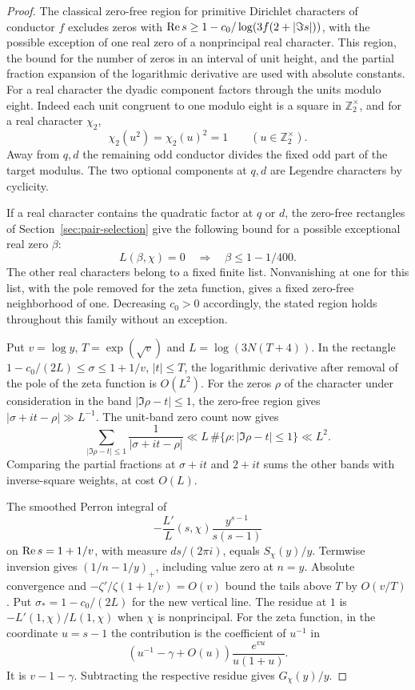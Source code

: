 \begin{proof}
The classical zero-free region for primitive Dirichlet characters of
conductor \(f\) excludes zeros with
\(\operatorname{Re} s\ge1-c_0/\log(3f(2+|\Im s|))\), with the possible
exception of one real zero of a nonprincipal real character.
This region, the bound for the number of zeros in an interval of unit height, and the partial fraction
expansion of the logarithmic derivative are used with absolute
constants. For a real character the dyadic component factors through the units modulo eight. Indeed each unit congruent to one modulo eight is a square in \(\mathbb Z_2^\times\), and for a real character \(\chi_2\),
\[
 \chi_2(u^2)=\chi_2(u)^2=1\qquad(u\in\mathbb Z_2^\times).
\]
\cite{classical-region} Away from \(q,d\) the
remaining odd conductor divides the fixed odd part of the target
modulus. The two optional components at \(q,d\) are Legendre
characters by cyclicity. 

If a real character contains the quadratic factor at \(q\) or \(d\),
the zero-free rectangles of Section~\ref{sec:pair-selection} give the following
bound for a possible exceptional real zero \(\beta\):
\[
 L(\beta,\chi)=0\quad\Longrightarrow\quad \beta\le 1-1/400 .
\] The other real characters
belong to a fixed finite list. Nonvanishing at one for this list,
with the pole removed for the zeta function, gives a fixed zero-free
neighborhood of one. Decreasing \(c_0>0\) accordingly, the
stated region holds throughout this family without an exception.

Put \(v=\log y\), \(T=\exp(\sqrt v)\) and
\(L=\log(3N(T+4))\). In the rectangle
\(1-c_0/(2L)\le\sigma\le1+1/v\), \(|t|\le T\), the logarithmic
derivative after removal of the pole of the zeta function is
\(O(L^2)\). For the zeros \(\rho\) of the character under consideration in the band \(|\Im\rho-t|\le1\), the zero-free region gives \(|\sigma+it-\rho|\gg L^{-1}\). The unit-band zero count now gives
\[
 \sum_{|\Im\rho-t|\le1}\frac{1}{|\sigma+it-\rho|}
 \ll L\,\#\{\rho:|\Im\rho-t|\le1\}\ll L^2 .
\] Comparing
the partial fractions at \(\sigma+it\) and \(2+it\) sums the other
bands with inverse-square weights, at cost \(O(L)\).


The smoothed Perron integral of
\[
       -\frac{L'}{L}(s,\chi)
                      \frac{y^{s-1}}{s(s-1)}
\]
on \(\operatorname{Re} s=1+1/v\), with measure \(ds/(2\pi i)\),
equals \(S_\chi(y)/y\). Termwise inversion gives
\((1/n-1/y)_+\), including value zero at \(n=y\).
Absolute convergence and \(-\zeta'/\zeta(1+1/v)=O(v)\) bound
the tails above \(T\) by \(O(v/T)\). Put \(\sigma_*=1-c_0/(2L)\) for the new vertical line.
The residue at \(1\) is \(-L'(1,\chi)/L(1,\chi)\)
when \(\chi\) is nonprincipal. For the zeta function,
in the coordinate \(u=s-1\) the contribution is the coefficient of
\(u^{-1}\) in
\[
     \left(u^{-1}-\gamma+O(u)\right)
             \frac{e^{v u}}{u(1+u)}.
\]
It is \(v-1-\gamma\). Subtracting the respective residue
gives \(G_\chi(y)/y\). 


\end{proof}
